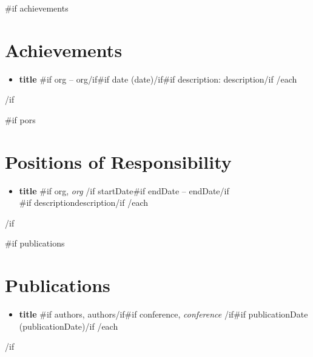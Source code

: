 \documentclass[10pt,a4paper]{article}
\newcommand{\resumeItem}[1]{\item\small{#1}}
\begin{document}
{{#if achievements}}
\section{Achievements}
\begin{itemize}[leftmargin=12pt, topsep=0pt, itemsep=2pt]
{{#each achievements}}
  \resumeItem{\small{}\textbf{ {{title}} }{{#if org}} -- {{org}}{{/if}}{{#if date}} ({{date}}){{/if}}{{#if description}}: {{description}}{{/if}} }
{{/each}}
\end{itemize}
{{/if}}

{{#if pors}}
\section{Positions of Responsibility}
\begin{itemize}[leftmargin=0pt, label={}, topsep=0pt, itemsep=4pt]
{{#each pors}}
  \item
    \textbf{ {{title}} }{{#if org}}, \textit{ {{org}} }{{/if}}
    \hfill \textcolor{muted}{\small{}{{startDate}}{{#if endDate}} -- {{endDate}}{{/if}} }\\
    {{#if description}}\small{}{{description}}{{/if}}
{{/each}}
\end{itemize}
{{/if}}

{{#if publications}}
\section{Publications}
\begin{itemize}[leftmargin=12pt, topsep=0pt, itemsep=2pt]
{{#each publications}}
  \resumeItem{\small{}\textbf{ {{title}} }{{#if authors}}, {{authors}}{{/if}}{{#if conference}}, \textit{ {{conference}} }{{/if}}{{#if publicationDate}} ({{publicationDate}}){{/if}} }
{{/each}}
\end{itemize}
{{/if}}
\end{document}
